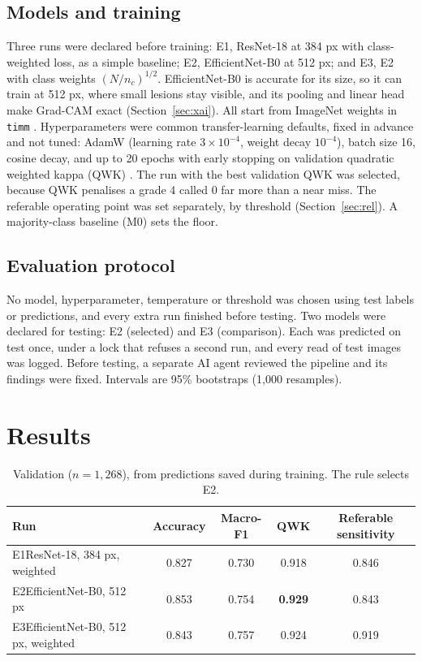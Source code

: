 \documentclass[11pt,a4paper]{article}
\newcommand{\header}{\rowcolor{tint}}
\begin{document}
\subsection{Models and training}
Three runs were declared before training: E1, ResNet-18 \cite{he2016} at 384 px with class-weighted loss, as a simple baseline; E2, EfficientNet-B0 \cite{tan2019} at 512 px; and E3, E2 with class weights $(N/n_c)^{1/2}$. EfficientNet-B0 is accurate for its size, so it can train at 512 px, where small lesions stay visible, and its pooling and linear head make Grad-CAM exact (Section~\ref{sec:xai}). All start from ImageNet weights in \texttt{timm} \cite{timm}. Hyperparameters were common transfer-learning defaults, fixed in advance and not tuned: AdamW (learning rate $3\times10^{-4}$, weight decay $10^{-4}$), batch size 16, cosine decay, and up to 20 epochs with early stopping on validation quadratic weighted kappa (QWK) \cite{cohen1968}. The run with the best validation QWK was selected, because QWK penalises a grade 4 called 0 far more than a near miss. The referable operating point was set separately, by threshold (Section~\ref{sec:rel}). A majority-class baseline (M0) sets the floor.

\subsection{Evaluation protocol}
No model, hyperparameter, temperature or threshold was chosen using test labels or predictions, and every extra run finished before testing. Two models were declared for testing: E2 (selected) and E3 (comparison). Each was predicted on test once, under a lock that refuses a second run, and every read of test images was logged. Before testing, a separate AI agent reviewed the pipeline and its findings were fixed. Intervals are 95\% bootstraps (1,000 resamples).

\section{Results}

\begin{table}[ht]
\centering\small
\caption{Validation ($n = 1{,}268$), from predictions saved during training. The rule selects E2.}
\label{tab:val}
\begin{tabular}{lcccc}
\toprule
\header Run & Accuracy & Macro-F1 & QWK & Referable sensitivity \\
\midrule
E1\enspace ResNet-18, 384 px, weighted & 0.827 & 0.730 & 0.918 & 0.846 \\
E2\enspace EfficientNet-B0, 512 px & 0.853 & 0.754 & \textbf{0.929} & 0.843 \\
E3\enspace EfficientNet-B0, 512 px, weighted & 0.843 & 0.757 & 0.924 & 0.919 \\
\bottomrule
\end{tabular}
\end{table}
\end{document}
